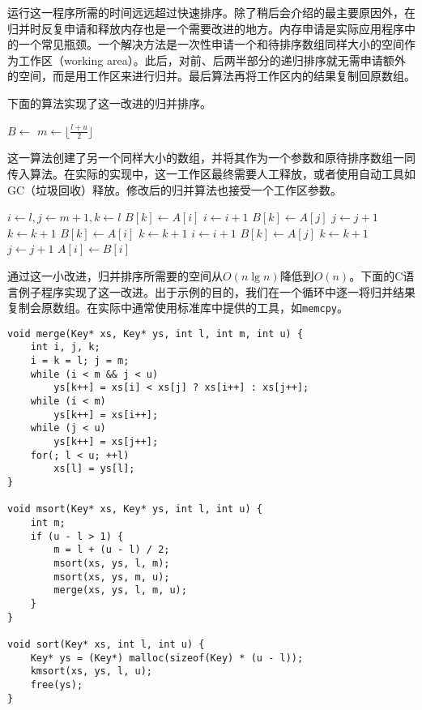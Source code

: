 \documentclass[UTF8]{article}
\begin{document}
运行这一程序所需的时间远远超过快速排序。除了稍后会介绍的最主要原因外，在归并时反复申请和释放内存也是一个需要改进的地方。内存申请是实际应用程序中的一个常见瓶颈\cite{Bentley}。一个解决方法是一次性申请一个和待排序数组同样大小的空间作为工作区（working area）。此后，对前、后两半部分的递归排序就无需申请额外的空间，而是用工作区来进行归并。最后算法再将工作区内的结果复制回原数组。

下面的算法实现了这一改进的归并排序。

\begin{algorithmic}[1]
  \State $B \gets $ 
  \State {}
\EndProcedure
\Statex
{}
    \State $m \gets \lfloor \frac{l + u}{2} \rfloor$
    \State {}
    \State {}
    \State {}
  \EndIf
\EndProcedure
\end{algorithmic}

这一算法创建了另一个同样大小的数组，并将其作为一个参数和原待排序数组一同传入算法。在实际的实现中，这一工作区最终需要人工释放，或者使用自动工具如GC（垃圾回收）释放。修改后的归并算法也接受一个工作区参数。

\begin{algorithmic}[1]
  \State $i \gets l, j \gets m + 1, k \gets l$
      \State $B[k] \gets A[i]$
      \State $i \gets i + 1$
    \Else
      \State $B[k] \gets A[j]$
      \State $j \gets j + 1$
    \EndIf
    \State $k \gets k + 1$
  \EndWhile
    \State $B[k] \gets A[i]$
    \State $k \gets k + 1$
    \State $i \gets i + 1$
  \EndWhile
    \State $B[k] \gets A[j]$
    \State $k \gets k + 1$
    \State $j \gets j + 1$
  \EndWhile
   
    \State $A[i] \gets B[i]$
  \EndFor
\EndProcedure
\end{algorithmic}

通过这一小改进，归并排序所需要的空间从$O(n \lg n)$降低到$O(n)$。下面的C语言例子程序实现了这一改进。出于示例的目的，我们在一个循环中逐一将归并结果复制会原数组。在实际中通常使用标准库中提供的工具，如\texttt{memcpy}。

\lstset{language=C}
\begin{lstlisting}
void merge(Key* xs, Key* ys, int l, int m, int u) {
    int i, j, k;
    i = k = l; j = m;
    while (i < m && j < u)
        ys[k++] = xs[i] < xs[j] ? xs[i++] : xs[j++];
    while (i < m)
        ys[k++] = xs[i++];
    while (j < u)
        ys[k++] = xs[j++];
    for(; l < u; ++l)
        xs[l] = ys[l];
}

void msort(Key* xs, Key* ys, int l, int u) {
    int m;
    if (u - l > 1) {
        m = l + (u - l) / 2;
        msort(xs, ys, l, m);
        msort(xs, ys, m, u);
        merge(xs, ys, l, m, u);
    }
}

void sort(Key* xs, int l, int u) {
    Key* ys = (Key*) malloc(sizeof(Key) * (u - l));
    kmsort(xs, ys, l, u);
    free(ys);
}
\end{lstlisting}
\end{document}
